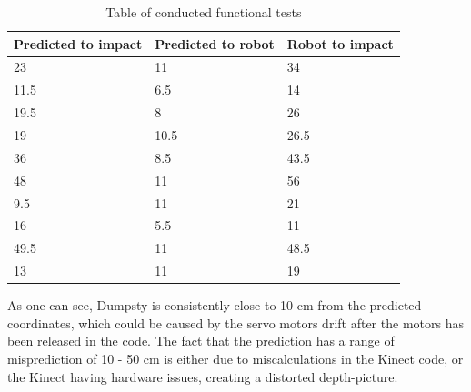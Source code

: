 \begin{table}
	\begin{center}
		\begin{tabular}{ | p{5cm} | p{5cm} | p{5cm} |}
			\hline
			\textbf{Predicted to impact} & \textbf{Predicted to robot} & \textbf{Robot to impact} \\ \hline
			23 & 11 & 34 \\ \hline
			11.5 & 6.5 & 14 \\ \hline
			19.5 & 8 & 26 \\ \hline
			19 & 10.5 & 26.5 \\ \hline
			36 & 8.5 & 43.5 \\ \hline
			48 & 11 & 56 \\ \hline
			9.5 & 11 & 21 \\ \hline
			16 & 5.5 & 11 \\ \hline
			49.5 & 11 & 48.5 \\ \hline
			13 & 11 & 19 \\ \hline
			
		\end{tabular}
		\caption{Table of conducted functional tests}
		\label{table:FuncTest}
	\end{center}
\end{table}

As one can see, Dumpsty is consistently close to 10 cm from the predicted coordinates, which could be caused by the servo motors drift after the motors has been released in the code. The fact that the prediction has a range of misprediction of 10 - 50 cm is either due to miscalculations in the Kinect code, or the Kinect having hardware issues, creating a distorted depth-picture.